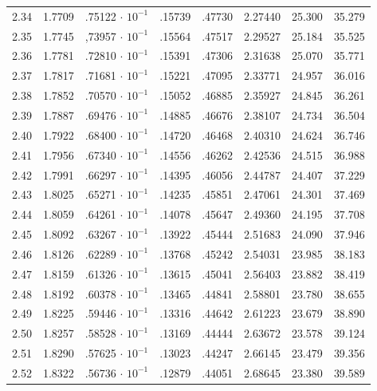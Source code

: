 \begin{minipage}{0.435\textwidth}
{\begin{tabular}{c|c|c|c|c|c|c|c}
        2.34 & 1.7709 & .75122$\,\cdot\,10^{-1}$ & .15739 & .47730 & 2.27440 & 25.300 & 35.279 \\ \arrayrulecolor{RoyalPurple}\hline\arrayrulecolor{black}
        2.35 & 1.7745 & ,73957$\,\cdot\,10^{-1}$ & .15564 & .47517 & 2.29527 & 25.184 & 35.525 \\
        2.36 & 1.7781 & .72810$\,\cdot\,10^{-1}$ & .15391 & .47306 & 2.31638 & 25.070 & 35.771 \\
        2.37 & 1.7817 & .71681$\,\cdot\,10^{-1}$ & .15221 & .47095 & 2.33771 & 24.957 & 36.016 \\
        2.38 & 1.7852 & .70570$\,\cdot\,10^{-1}$ & .15052 & .46885 & 2.35927 & 24.845 & 36.261 \\
        2.39 & 1.7887 & .69476$\,\cdot\,10^{-1}$ & .14885 & .46676 & 2.38107 & 24.734 & 36.504 \\
        2.40 & 1.7922 & .68400$\,\cdot\,10^{-1}$ & .14720 & .46468 & 2.40310 & 24.624 & 36.746 \\
        2.41 & 1.7956 & .67340$\,\cdot\,10^{-1}$ & .14556 & .46262 & 2.42536 & 24.515 & 36.988 \\
        2.42 & 1.7991 & .66297$\,\cdot\,10^{-1}$ & .14395 & .46056 & 2.44787 & 24.407 & 37.229 \\
        2.43 & 1.8025 & .65271$\,\cdot\,10^{-1}$ & .14235 & .45851 & 2.47061 & 24.301 & 37.469 \\
        2.44 & 1.8059 & .64261$\,\cdot\,10^{-1}$ & .14078 & .45647 & 2.49360 & 24.195 & 37.708 \\
        2.45 & 1.8092 & .63267$\,\cdot\,10^{-1}$ & .13922 & .45444 & 2.51683 & 24.090 & 37.946 \\
        2.46 & 1.8126 & .62289$\,\cdot\,10^{-1}$ & .13768 & .45242 & 2.54031 & 23.985 & 38.183 \\
        2.47 & 1.8159 & .61326$\,\cdot\,10^{-1}$ & .13615 & .45041 & 2.56403 & 23.882 & 38.419 \\
        2.48 & 1.8192 & .60378$\,\cdot\,10^{-1}$ & .13465 & .44841 & 2.58801 & 23.780 & 38.655 \\
        2.49 & 1.8225 & .59446$\,\cdot\,10^{-1}$ & .13316 & .44642 & 2.61223 & 23.679 & 38.890 \\
        2.50 & 1.8257 & .58528$\,\cdot\,10^{-1}$ & .13169 & .44444 & 2.63672 & 23.578 & 39.124 \\
        2.51 & 1.8290 & .57625$\,\cdot\,10^{-1}$ & .13023 & .44247 & 2.66145 & 23.479 & 39.356 \\
        2.52 & 1.8322 & .56736$\,\cdot\,10^{-1}$ & .12879 & .44051 & 2.68645 & 23.380 & 39.589 \\

\end{tabular}}
\end{minipage}

